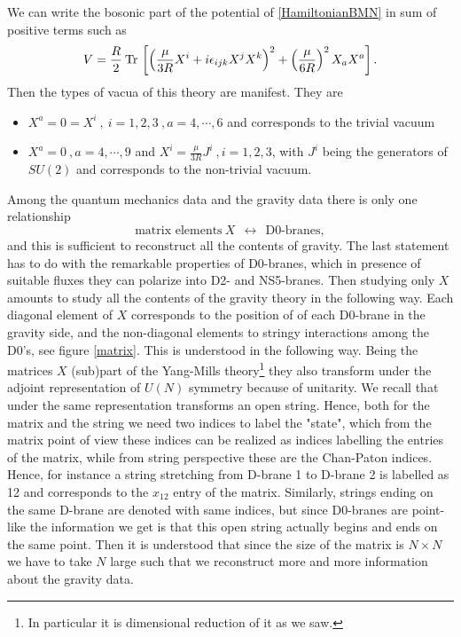 \documentclass[11pt,english]{article}
\newcommand{\be}{\begin{equation}}
\newcommand{\ee}{\end{equation}}
\newcommand{\Tr}[1]{\:{\rm Tr}\,#1}
\numberwithin{equation}{section}
\begin{document}
We can write the bosonic part of the potential of \eqref{HamiltonianBMN} in sum of positive terms such as 
\be \label{BMNpotential}
V=\frac{R}{2}\Tr{\left[\left(\frac{\mu}{3R}X^i+i\epsilon_{ijk}X^jX^k\right)^2+\left(\frac{\mu}{6R}\right)^2X_aX^a\right]}.
\ee 
Then the types of vacua of this theory are manifest. They are 
\begin{itemize}
	\item $X^a=0=X^i~,~i=1,2,3~,a=4,\cdots, 6$ and corresponds to the trivial vacuum
	\item $X^a=0~,a=4,\cdots,9$ and $X^i=\frac{\mu}{3R}J^i~,i=1,2,3$, with $J^i$ being the generators of $SU(2)$ and corresponds to the non-trivial vacuum. 
\end{itemize} 

Among the quantum mechanics data and the gravity data there is only one relationship  
\be 
\text{matrix elements} ~X~~ \longleftrightarrow ~~\text{D0-branes},
\ee 
and this is sufficient to reconstruct all the contents of gravity. The last statement has to do with the remarkable properties of D0-branes, which in presence of suitable fluxes they can polarize into D2- and NS5-branes. Then studying only $X$ amounts to study all the contents of the gravity theory in the following way.  Each diagonal element of $X$ corresponds to the position of of each D0-brane in the gravity side, and the non-diagonal elements to stringy interactions among the D0's, see figure \ref{matrix}. This is understood in the following way. Being the matrices $X$ (sub)part of the Yang-Mills theory\footnote{In particular it is dimensional reduction of it as we saw.} they also transform under the adjoint representation of  $U(N)$ symmetry because of unitarity. We recall that under the same representation transforms an open string. Hence, both for the matrix and the string we need two indices to label the "state", which from the matrix point of view these indices can be realized as indices labelling the entries of the matrix, while from string perspective these are the Chan-Paton indices. Hence, for instance a string stretching from D-brane 1 to D-brane 2 is labelled as 12 and corresponds to the $x_{12}$ entry of the matrix. Similarly, strings ending on the same D-brane are denoted with same indices, but since D0-branes are point-like the information we get is that this open string actually begins and ends on the same point.  Then it is understood that since the size of the matrix is $N\times N$ we have to take $N$ large such that we reconstruct more and more information about the gravity data.  
\end{document}
